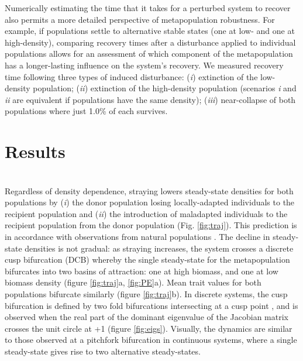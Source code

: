 \documentclass{revtex4}
\begin{document}
Numerically estimating the time that it takes for a perturbed system to recover also permits a more detailed perspective of metapopulation robustness.
For example, if populations settle to alternative stable states (one at low- and one at high-density), comparing recovery times after a disturbance applied to individual populations allows for an assessment of which component of the metapopulation has a longer-lasting influence on the system's recovery. %
We measured recovery time following three types of induced disturbance: (\emph{i}) extinction of the low-density population; (\emph{ii}) extinction of the high-density population (scenarios \emph{i} and \emph{ii} are equivalent if populations have the same density); (\emph{iii}) near-collapse of both populations where just 1.0\% of each survives.
\\


\section{Results}


 \\
\noindent Regardless of density dependence, straying lowers steady-state densities for both populations by (\emph{i}) the donor population losing locally-adapted individuals to the recipient population and (\emph{ii}) the introduction of maladapted individuals to the recipient population from the donor population (Fig. \ref{fig:traj}).
This prediction is in accordance with observations from natural populations \citep{Bett:2017ha}. %
The decline in steady-state densities is not gradual: as straying increases, the system crosses a discrete cusp bifurcation (DCB) \citep{AleksandrovichKuznetsov:1995p2580} whereby the single steady-state for the metapopulation bifurcates into two basins of attraction: one at high biomass, and one at low biomass density (figure \ref{fig:traj}a, \ref{fig:PE}a).
Mean trait values for both populations bifurcate similarly (figure \ref{fig:traj}b). 
In discrete systems, the cusp bifurcation is defined by two fold bifurcations intersecting at a cusp point \citep{AleksandrovichKuznetsov:1995p2580}, and is observed when the real part of the dominant eigenvalue of the Jacobian matrix crosses the unit circle at +1 (figure \ref{fig:eigs}).
Visually, the dynamics are similar to those observed at a pitchfork bifurcation in continuous systems, where a single steady-state gives rise to two alternative steady-states.
\end{document}

